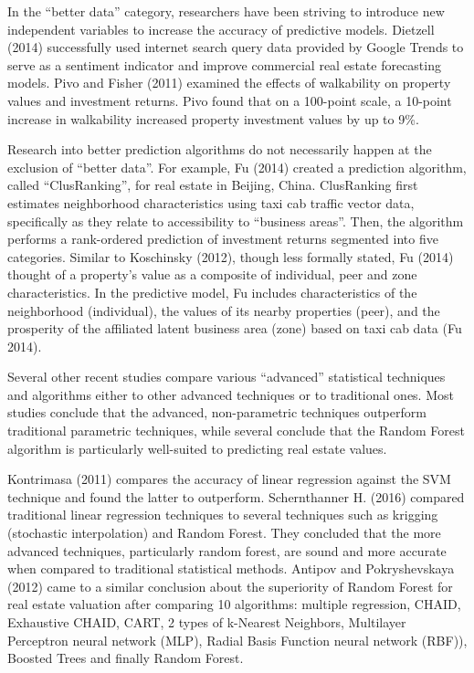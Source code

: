 \documentclass[12pt,]{article}
\begin{document}
In the ``better data'' category, researchers have been striving to
introduce new independent variables to increase the accuracy of
predictive models. Dietzell (2014) successfully used internet search
query data provided by Google Trends to serve as a sentiment indicator
and improve commercial real estate forecasting models. Pivo and Fisher
(2011) examined the effects of walkability on property values and
investment returns. Pivo found that on a 100-point scale, a 10-point
increase in walkability increased property investment values by up to
9\%.

Research into better prediction algorithms do not necessarily happen at
the exclusion of ``better data''. For example, Fu (2014) created a
prediction algorithm, called ``ClusRanking'', for real estate in
Beijing, China. ClusRanking first estimates neighborhood characteristics
using taxi cab traffic vector data, specifically as they relate to
accessibility to ``business areas''. Then, the algorithm performs a
rank-ordered prediction of investment returns segmented into five
categories. Similar to Koschinsky (2012), though less formally stated,
Fu (2014) thought of a property's value as a composite of individual,
peer and zone characteristics. In the predictive model, Fu includes
characteristics of the neighborhood (individual), the values of its
nearby properties (peer), and the prosperity of the affiliated latent
business area (zone) based on taxi cab data (Fu 2014).

Several other recent studies compare various ``advanced'' statistical
techniques and algorithms either to other advanced techniques or to
traditional ones. Most studies conclude that the advanced,
non-parametric techniques outperform traditional parametric techniques,
while several conclude that the Random Forest algorithm is particularly
well-suited to predicting real estate values.

Kontrimasa (2011) compares the accuracy of linear regression against the
SVM technique and found the latter to outperform. Schernthanner H.
(2016) compared traditional linear regression techniques to several
techniques such as krigging (stochastic interpolation) and Random
Forest. They concluded that the more advanced techniques, particularly
random forest, are sound and more accurate when compared to traditional
statistical methods. Antipov and Pokryshevskaya (2012) came to a similar
conclusion about the superiority of Random Forest for real estate
valuation after comparing 10 algorithms: multiple regression, CHAID,
Exhaustive CHAID, CART, 2 types of k-Nearest Neighbors, Multilayer
Perceptron neural network (MLP), Radial Basis Function neural network
(RBF)), Boosted Trees and finally Random Forest.
\end{document}
